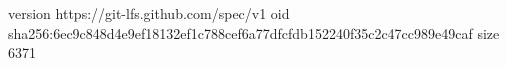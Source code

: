 version https://git-lfs.github.com/spec/v1
oid sha256:6ec9c848d4e9ef18132ef1c788cef6a77dfcfdb152240f35c2c47cc989e49caf
size 6371
